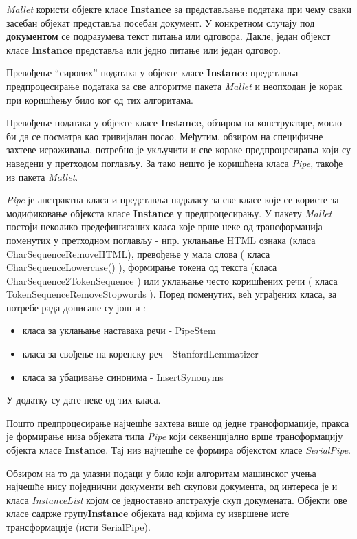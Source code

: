  

\textit{Mallet} користи објекте класе \textbf{Instance} за представљање података при чему  сваки засебан објекат  представља посебан документ. У конкретном случају под \textbf{документом} се подразумева текст питања или одговора.  Дакле, један објекст класе \textbf{Instance}  представља или једно питање или један одговор.

Превођење "`сирових"' података у објекте класе  \textbf{Instance} представља предпроцесирање података за све алгоритме пакета \textit{Mallet} и неопходан је корак при коришћењу било ког од тих алгоритама. 

Превођење података у објекте класе \textbf{Instance}, обзиром на конструкторе, могло би да се посматра као тривијалан посао. Међутим, обзиром на специфичне захтеве исраживања, потребно је укључити и све кораке предпроцесирања који су наведени у претходом поглављу. За тако нешто је коришћена класа \textit{Pipe}, такође из пакета \textit{Mallet}.

\textit{Pipe} је апстрактна класа и представља надкласу за све класе које се користе за модификовање објекста  класе \textbf{Instance} у предпроцесирању. У пакету \textit{Mallet} постоји неколико предефинисаних класа које врше неке од трансформација поменутих у претходном поглављу - нпр. уклањање HTML ознака (класа CharSequenceRemoveHTML), превођење у мала слова ( класа  CharSequenceLowercase() ), формирање токена од текста (класа CharSequence2TokenSequence )  или уклањање често коришћених речи ( класа TokenSequenceRemoveStopwords ).
Поред поменутих, већ уграђених класа, за потребе рада дописане су још и :
\begin{itemize}
\item класа за уклањање наставака речи - PipeStem
\item класа за свођење на коренску реч - StanfordLemmatizer
\item класа за убацивање синонима - InsertSynonyms
\end{itemize}

У додатку су дате неке од тих класа.

Пошто предпроцесирање најчешће захтева више од једне трансформације, пракса је формирање низа објеката типа \textit{Pipe} који секвенцијално врше трансформацију објекта класе \textbf{Instance}. Тај низ најчешће се формира објекстом класе \textit{SerialPipe}.

Обзиром на то да улазни подаци у било који алгоритам машинског учења најчешће нису поједнични документи већ скупови документа, од интереса је и класа  \textit{InstanceList} којом се једноставно  апстрахује  скуп докумената. Објекти ове класе садрже групу\textbf{Instance} објеката над којима су извршене исте трансформације (исти SerialPipe).

